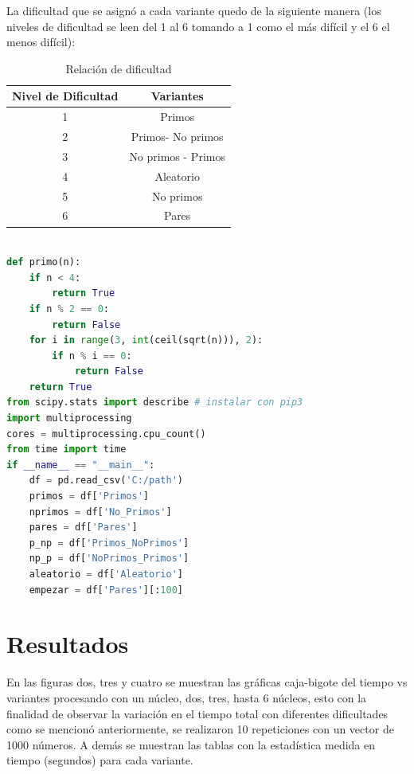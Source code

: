 \documentclass{article}
\begin{document}
La dificultad que se asignó a cada variante quedo de la siguiente manera (los niveles de dificultad se leen del 1 al 6 tomando a 1 como el más difícil y el 6 el menos difícil):

\begin{table}[h!]
\centering
 \begin{tabular}{||c c ||} 
 \hline
 Nivel de Dificultad & Variantes  \\ [0.5ex] 
 \hline\hline
 1 & Primos \\
 \hline
 2 & Primos- No primos\\ 
 \hline
 3 & No primos - Primos  \\
 \hline
 4 & Aleatorio \\
 \hline
 5 & No primos \\
 \hline
 6 & Pares \\ [1ex] 
 \hline
\end{tabular}
\caption{Relación de dificultad}
\label{table:1}
\end{table}

\begin{lstlisting}[language=Python, caption= Código para obtener los números primos y extraer los datos del CSV.]

def primo(n):
    if n < 4:
        return True
    if n % 2 == 0:
        return False
    for i in range(3, int(ceil(sqrt(n))), 2):
        if n % i == 0:
            return False
    return True
from scipy.stats import describe # instalar con pip3
import multiprocessing
cores = multiprocessing.cpu_count()
from time import time
if __name__ == "__main__":
    df = pd.read_csv('C:/path')
    primos = df['Primos']
    nprimos = df['No_Primos']
    pares = df['Pares']
    p_np = df['Primos_NoPrimos']
    np_p = df['NoPrimos_Primos']
    aleatorio = df['Aleatorio']
    empezar = df['Pares'][:100]

\end{lstlisting}

\section{Resultados}

En las figuras dos, tres y cuatro se muestran las gráficas caja-bigote del tiempo vs variantes procesando con un núcleo, dos, tres, hasta 6 núcleos, esto con la finalidad de observar la variación en el tiempo total con diferentes dificultades como se mencionó anteriormente, se realizaron 10 repeticiones con un vector de 1000 números.
A demás se muestran las tablas con la estadística medida en tiempo (segundos) para cada variante.
\end{document}
